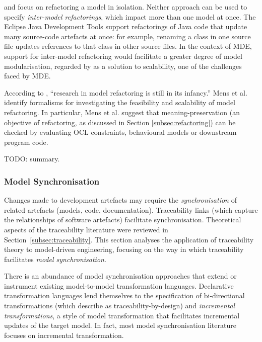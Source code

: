  
\cite{kolovos07ewl} and \cite{arendt09refactoring} focus on refactoring a model in isolation. Neither approach can be used to specify \emph{inter-model refactorings}, which impact more than one model at once. The Eclipse Java Development Tools support refactorings of Java code that update many source-code artefacts at once: for example, renaming a class in one source file updates references to that class in other source files. In the context of MDE, support for inter-model refactoring would facilitate a greater degree of model modularisation, regarded by \cite{kolovos08scalability} as a solution to scalability, one of the challenges faced by MDE.

According to \cite{mens07modelrefactoring}, ``research in model refactoring is still in its infancy.'' Mens et al. identify formalisms for investigating the feasibility and scalability of model refactoring. In particular, Mens et al. suggest that meaning-preservation (an objective of refactoring, as discussed in Section \ref{subsec:refactoring}) can be checked by evaluating OCL constraints, behavioural models or downstream program code.

TODO: summary.
 



\subsubsection{Model Synchronisation}
\label{subsubsec:model_synch}
Changes made to development artefacts may require the \emph{synchronisation} of related artefacts (models, code, documentation). Traceability links (which capture the relationships of software artefacts) facilitate synchronisation. Theoretical aspects of the traceability literature were reviewed in Section~\ref{subsec:traceability}. This section analyses the application of traceability theory to model-driven engineering, focusing on the way in which traceability facilitates \emph{model synchronisation}. 

There is an abundance of model synchronisation approaches that extend or instrument existing model-to-model transformation languages. Declarative transformation languages lend themselves to the specification of bi-directional transformations (which \cite{fritzsche08tracing} describe as traceability-by-design) and \emph{incremental transformations}, a style of model transformation that facilitates incremental updates of the target model. In fact, most model synchronisation literature focuses on incremental transformation. 

